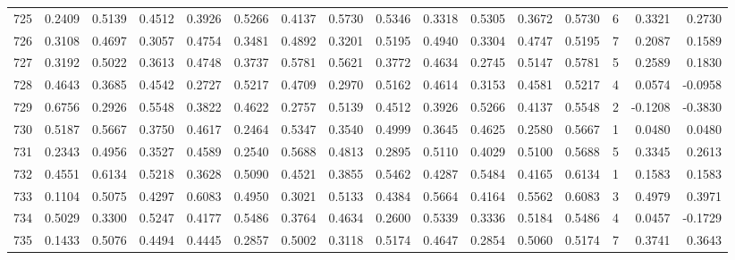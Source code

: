 \begin{tabular}{lrrrrrrrrrrrrrrr}
725 &      0.2409 &  0.5139 &  0.4512 &  0.3926 &  0.5266 &  0.4137 &  0.5730 &  0.5346 &  0.3318 &  0.5305 &   0.3672 &     0.5730 &      6 &                    0.3321 &                     0.2730 \\
726 &      0.3108 &  0.4697 &  0.3057 &  0.4754 &  0.3481 &  0.4892 &  0.3201 &  0.5195 &  0.4940 &  0.3304 &   0.4747 &     0.5195 &      7 &                    0.2087 &                     0.1589 \\
727 &      0.3192 &  0.5022 &  0.3613 &  0.4748 &  0.3737 &  0.5781 &  0.5621 &  0.3772 &  0.4634 &  0.2745 &   0.5147 &     0.5781 &      5 &                    0.2589 &                     0.1830 \\
728 &      0.4643 &  0.3685 &  0.4542 &  0.2727 &  0.5217 &  0.4709 &  0.2970 &  0.5162 &  0.4614 &  0.3153 &   0.4581 &     0.5217 &      4 &                    0.0574 &                    -0.0958 \\
729 &      0.6756 &  0.2926 &  0.5548 &  0.3822 &  0.4622 &  0.2757 &  0.5139 &  0.4512 &  0.3926 &  0.5266 &   0.4137 &     0.5548 &      2 &                   -0.1208 &                    -0.3830 \\
730 &      0.5187 &  0.5667 &  0.3750 &  0.4617 &  0.2464 &  0.5347 &  0.3540 &  0.4999 &  0.3645 &  0.4625 &   0.2580 &     0.5667 &      1 &                    0.0480 &                     0.0480 \\
731 &      0.2343 &  0.4956 &  0.3527 &  0.4589 &  0.2540 &  0.5688 &  0.4813 &  0.2895 &  0.5110 &  0.4029 &   0.5100 &     0.5688 &      5 &                    0.3345 &                     0.2613 \\
732 &      0.4551 &  0.6134 &  0.5218 &  0.3628 &  0.5090 &  0.4521 &  0.3855 &  0.5462 &  0.4287 &  0.5484 &   0.4165 &     0.6134 &      1 &                    0.1583 &                     0.1583 \\
733 &      0.1104 &  0.5075 &  0.4297 &  0.6083 &  0.4950 &  0.3021 &  0.5133 &  0.4384 &  0.5664 &  0.4164 &   0.5562 &     0.6083 &      3 &                    0.4979 &                     0.3971 \\
734 &      0.5029 &  0.3300 &  0.5247 &  0.4177 &  0.5486 &  0.3764 &  0.4634 &  0.2600 &  0.5339 &  0.3336 &   0.5184 &     0.5486 &      4 &                    0.0457 &                    -0.1729 \\
735 &      0.1433 &  0.5076 &  0.4494 &  0.4445 &  0.2857 &  0.5002 &  0.3118 &  0.5174 &  0.4647 &  0.2854 &   0.5060 &     0.5174 &      7 &                    0.3741 &                     0.3643 \\

\end{tabular}
